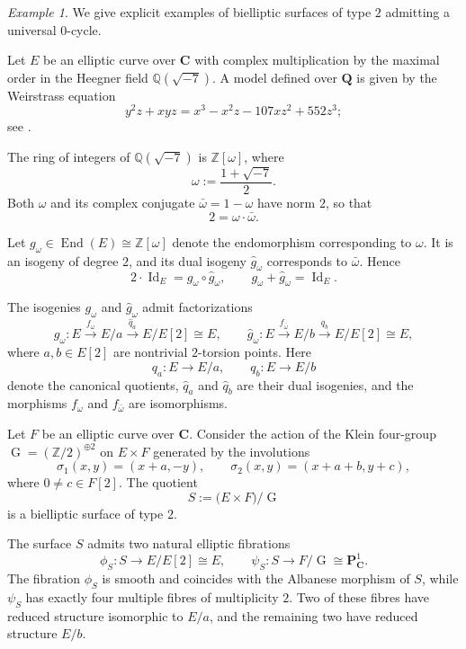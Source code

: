 \documentclass[11pt,letterpaper]{amsart}
\numberwithin{equation}{section}
\theoremstyle{definition}
\theoremstyle{remark}
\newtheorem{example}[theorem]{Example}
\newcommand{\Q}{\mathbb{Q}}
\newcommand{\Z}{\mathbb{Z}}
\newcommand{\bbC}{\mathbf{C}}
\newcommand{\bbP}{\mathbf{P}}
\newcommand{\bbQ}{\mathbf{Q}}
\DeclareMathOperator{\End}{End}
\DeclareMathOperator{\Id}{Id}
\DeclareMathOperator{\Gi}{G}
\begin{document}
\begin{example}\label{ex:bielliptic_uni_0_cycle}
We give explicit examples of bielliptic surfaces of type $2$ admitting a universal $0$-cycle.

Let $E$ be an elliptic curve over $\bbC$ with complex multiplication by the maximal order in the Heegner field $\Q(\sqrt{-7})$. A model defined over $\bbQ$ is given by the Weirstrass equation $$y^2z+xyz=x^3-x^2z-107xz^2+552z^3;$$ see \cite[\href{https://www.lmfdb.org/EllipticCurve/Q/49.a2}{Elliptic Curve 49.a2}]{lmfdb}. 

The ring of integers of $\Q(\sqrt{-7})$ is $\Z[\omega]$, where 
$$
\omega:=\frac{1+\sqrt{-7}}{2}.
$$
Both $\omega$ and its complex conjugate $\bar{\omega}=1-\omega$ have norm $2$, so that
$$
2=\omega\cdot\bar{\omega}.
$$

Let $g_{\omega}\in\End(E)\cong\Z[\omega]$ denote the endomorphism corresponding to $\omega$. It is an isogeny of degree $2$, and its dual isogeny $\hat g_{\omega}$ corresponds to $\bar{\omega}$. Hence
\begin{equation}\label{eq:deg_2_isog}
2\cdot\Id_{E}=g_{\omega}\circ\hat g_{\omega}, 
\qquad 
g_{\omega}+\hat g_{\omega}=\Id_E .
\end{equation}

The isogenies $g_{\omega}$ and $\hat g_{\omega}$ admit factorizations
$$
g_{\omega}\colon 
E \overset{f_{\omega}}{\longrightarrow} E/a 
\overset{\hat q_a}{\longrightarrow} E/E[2] \cong E,
\qquad
\hat g_{\omega}\colon 
E \overset{f_{\bar\omega}}{\longrightarrow} E/b 
\overset{\hat q_b}{\longrightarrow} E/E[2] \cong E,
$$
where $a,b\in E[2]$ are nontrivial $2$-torsion points. Here 
$$
q_a\colon E\longrightarrow E/a, 
\qquad 
q_b\colon E\longrightarrow E/b
$$
denote the canonical quotients, $\hat q_a$ and $\hat q_b$ are their dual isogenies, and the morphisms $f_{\omega}$ and $f_{\bar\omega}$ are isomorphisms.

Let $F$ be an elliptic curve over $\bbC$. Consider the action of the Klein four-group $\Gi=(\Z/2)^{\oplus 2}$ on $E\times F$ generated by the involutions
$$
\sigma_1(x,y)=(x+a,-y), 
\qquad 
\sigma_2(x,y)=(x+a+b,y+c),
$$
where $0\neq c\in F[2]$. The quotient
$$
S:=\bigl(E\times F\bigr)/\Gi
$$
is a bielliptic surface of type $2$.

The surface $S$ admits two natural elliptic fibrations
$$
\phi_S\colon S\longrightarrow E/E[2]\cong E,
\qquad
\psi_S\colon S\longrightarrow F/\Gi\cong \bbP^1_{\bbC}.
$$
The fibration $\phi_S$ is smooth and coincides with the Albanese morphism of $S$, while $\psi_S$ has exactly four multiple fibres of multiplicity $2$. Two of these fibres have reduced structure isomorphic to $E/a$, and the remaining two have reduced structure $E/b$.


\end{example}
\end{document}
